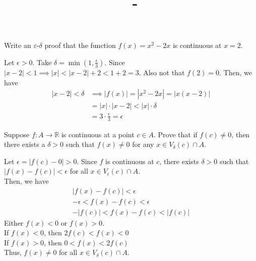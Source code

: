 \documentclass[answers,12pt,addpoints]{exam}
\author{\name}
\title{\course \ - \assignment}
\begin{document}
\maketitle

\begin{questions}
    \question Write an $\varepsilon$-$\delta$ proof that the function $f(x) = x^2 - 2x$ is continuous at $x = 2$.
    \begin{solution}
        Let $\epsilon > 0$. Take $\delta = \min\left(1, \frac{\epsilon}{3}\right)$. Since $|x-2|<1 \implies |x| <|x-2|+2 < 1+2 =3$. Also not that $f(2) = 0$. Then, we have
        \begin{align*}
            |x - 2| < \delta &\implies |f(x)| = |x^2 - 2x| = |x(x - 2)| \\
            &= |x| \cdot |x - 2| < |x| \cdot \delta \\
            &= 3 \cdot \frac{\epsilon}{3} = \epsilon
        \end{align*}
    \end{solution}

    \question Suppose $f : A \to \mathbb{R}$ is continuous at a point $c \in A$. Prove that if $f(c) \neq 0$, then there exists a $\delta > 0$ such that $f(x) \neq 0$ for any $x \in V_\delta(c) \cap A$.
    \begin{solution}
        Let $\epsilon = |f(c) - 0| > 0$. Since $f$ is continuous at $c$, there exists $\delta > 0$ such that $|f(x) - f(c)| < \epsilon$ for all $x \in V_\epsilon(c) \cap A$.\\
        Then, we have
        \begin{align*}
            |f(x) - f(c)| < \epsilon \\
            -\epsilon < f(x) - f(c) < \epsilon \\
            -|f(c)| < f(x) - f(c) < |f(c)|
        \end{align*}
        Either $f(x) < 0$ or $f(x) > 0$.\\
        If $f(x) < 0$, then $2f(c) < f(x) <0$\\
        If $f(x) > 0$, then $0 < f(x) < 2f(c)$\\
        Thus, $f(x) \neq 0$ for all $x \in V_\delta(c) \cap A$.
    \end{solution}


\end{questions}
\end{document}
